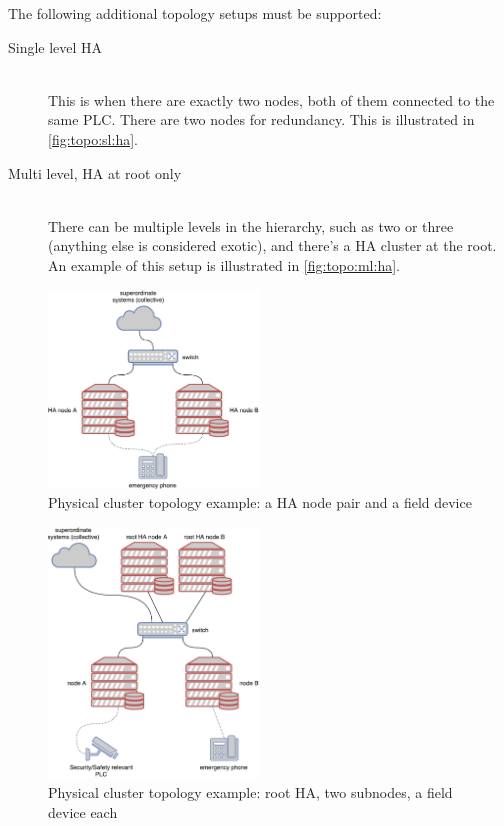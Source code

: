 The following additional topology setups must be supported:
\begin{description}
	\item [ Single level \gls{HA} ] \hfill\\
		This is when there are exactly two nodes, both of them
		connected to the same PLC. There are two nodes for redundancy. This is illustrated in
		\autoref{fig:topo:sl:ha}.

	\item [ Multi level, \gls{HA} at root only ] \hfill\\
		There can be multiple levels in the hierarchy, such as two or
		three (anything else is considered exotic), and there's a HA
		cluster at the root. An example of this setup is illustrated in
		\autoref{fig:topo:ml:ha}.
\end{description}

\begin{figure}[]
	\center
	\includegraphics[width=0.5\textwidth]{img/topo_sl_ha.pdf}
	\caption{Physical cluster topology example: a HA node pair and a field device}
	\label{fig:topo:sl:ha}
\end{figure}
\begin{figure}[]
	\center
	\includegraphics[width=0.5\textwidth]{img/topo_ml_ha.pdf}
	\caption{Physical cluster topology example: root HA, two subnodes, a field device each}
	\label{fig:topo:ml:ha}
\end{figure}

